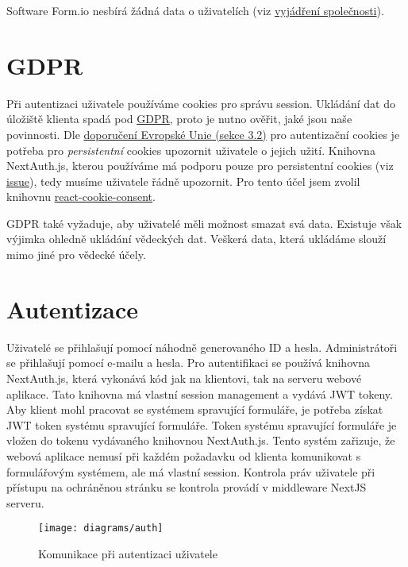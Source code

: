 Software Form.io nesbírá žádná data o uživatelích (viz \href{https://github.com/formio/formio/issues/1499}{vyjádření společnosti}).


\section{GDPR}\label{sec:gdpr}

Při autentizaci uživatele používáme cookies pro správu session.
Ukládání dat do úložiště klienta spadá pod \href{https://eur-lex.europa.eu/eli/reg/2016/679/oj}{GDPR}, proto je nutno ověřit, jaké jsou naše povinnosti.
Dle \href{https://ec.europa.eu/justice/article-29/documentation/opinion-recommendation/files/2012/wp194_en.pdf}{doporučení Evropské Unie (sekce 3.2)} pro autentizační cookies je potřeba pro \emph{persistentní} cookies upozornit uživatele o jejich užití.
Knihovna NextAuth.js, kterou používáme má podporu pouze pro persistentní cookies (viz \href{https://github.com/nextauthjs/next-auth/issues/2534}{issue}), tedy musíme uživatele řádně upozornit.
Pro tento účel jsem zvolil knihovnu \href{https://www.npmjs.com/package/react-cookie-consent}{react-cookie-consent}.

GDPR také vyžaduje, aby uživatelé měli možnost smazat svá data.
Existuje však výjimka ohledně ukládání vědeckých dat.
Veškerá data, která ukládáme slouží mimo jiné pro vědecké účely.


\section{Autentizace}\label{sec:auth}

Uživatelé se přihlašují pomocí náhodně generovaného ID a hesla.
Administrátoři se přihlašují pomocí e-mailu a hesla.
Pro autentifikaci se používá knihovna NextAuth.js, která vykonává kód jak na klientovi, tak na serveru webové aplikace.
Tato knihovna má vlastní session management a vydává JWT tokeny.
Aby klient mohl pracovat se systémem spravující formuláře, je potřeba získat JWT token systému spravující formuláře.
Token systému spravující formuláře je vložen do tokenu vydávaného knihovnou NextAuth.js.
Tento systém zařizuje, že webová aplikace nemusí při každém požadavku od klienta komunikovat s formulářovým systémem, ale má vlastní session.
Kontrola práv uživatele při přístupu na ochráněnou stránku se kontrola provádí v middleware NextJS serveru.

\begin{figure}[H]
    \texttt{[image: diagrams/auth]}
    \caption{Komunikace při autentizaci uživatele}\label{fig:auth}
\end{figure}


